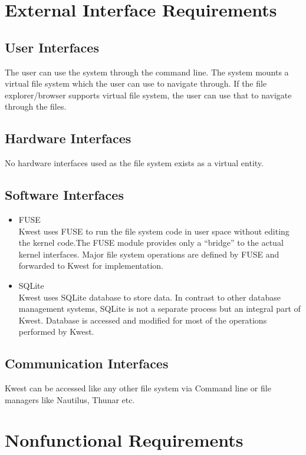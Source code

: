 \section {External Interface Requirements}

\subsection {User Interfaces}
The user can use the system through the command line. The system mounts a virtual file system which the user can use to navigate through. If the file explorer/browser supports virtual file system, the user can use that to navigate through the files. 

\subsection {Hardware Interfaces}
No hardware interfaces used as the file system exists as a virtual entity.

\subsection {Software Interfaces}
\begin{itemize}
\item FUSE\cite{FUSE} \\
Kwest uses FUSE to run the file system code in user space without editing the kernel code.The FUSE module provides only a ``bridge'' to the actual kernel interfaces. Major file system operations are defined by FUSE and forwarded to Kwest for implementation.
\item SQLite\cite{SQLITE} \\
Kwest uses SQLite database to store data. In contrast to other database management systems, SQLite is not a separate process but an integral part of Kwest. Database is accessed and modified for most of the operations performed by Kwest.
\end{itemize}
\subsection {Communication Interfaces}
Kwest can be accessed like any other file system via Command line or file managers like Nautilus, Thunar etc.

\section {Nonfunctional Requirements}


